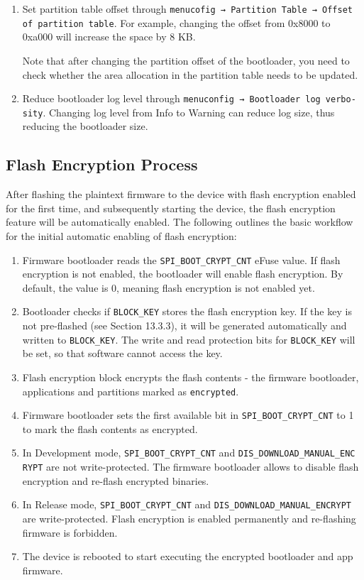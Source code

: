 \documentclass[a4paper,12pt,openany]{book}
\begin{document}
\begin{enumerate}[label=(\arabic*)]
    \item Set partition table offset through \verb|menucofig → Partition Table → Offset|\\ \verb|of partition table|. For example, changing the offset from 0x8000 to 0xa000 will increase the space by 8 KB.
    
    Note that after changing the partition offset of the bootloader, you need to check whether the area allocation in the partition table needs to be updated.

    \item Reduce bootloader log level through \verb|menuconfig → Bootloader log verbo-|\\ \verb|sity|. Changing log level from Info to Warning can reduce log size, thus reducing the bootloader size.
\end{enumerate}

\subsection{Flash Encryption Process}
After flashing the plaintext firmware to the device with flash encryption enabled for the first time, and subsequently starting the device, the flash encryption feature will be automatically enabled. The following outlines the basic workflow for the initial automatic enabling of flash encryption:

\begin{enumerate}[label=(\arabic*)]
    \item Firmware bootloader reads the \verb|SPI_BOOT_CRYPT_CNT| eFuse value. If flash encryption is not enabled, the bootloader will enable flash encryption. By default, the value is 0, meaning flash encryption is not enabled yet.
    \item Bootloader checks if \verb|BLOCK_KEY| stores the flash encryption key. If the key is not pre-flashed (see Section 13.3.3), it will be generated automatically and written to \verb|BLOCK_KEY|. The write and read protection bits for \verb|BLOCK_KEY| will be set, so that software cannot access the key.
    \item Flash encryption block encrypts the flash contents - the firmware bootloader, applications and partitions marked as \verb|encrypted|.
    \item Firmware bootloader sets the first available bit in \verb|SPI_BOOT_CRYPT_CNT| to 1 to mark the flash contents as encrypted.
    \item In Development mode, \verb|SPI_BOOT_CRYPT_CNT| and \verb|DIS_DOWNLOAD_MANUAL_ENC|\\ \verb|RYPT| are not write-protected. The firmware bootloader allows to disable flash encryption and re-flash encrypted binaries.
    \item In Release mode, \verb|SPI_BOOT_CRYPT_CNT| and \verb|DIS_DOWNLOAD_MANUAL_ENCRYPT| are write-protected. Flash encryption is enabled permanently and re-flashing firmware is forbidden.
    \item The device is rebooted to start executing the encrypted bootloader and app firmware.
\end{enumerate}
\end{document}
